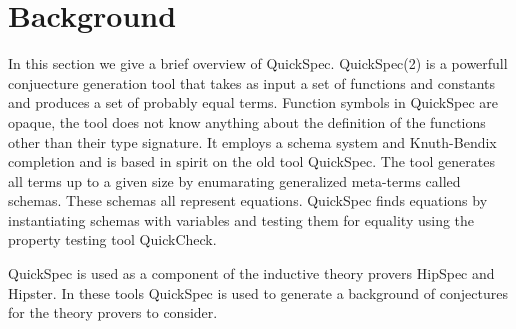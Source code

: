 \section{Background}
In this section we give a brief overview of
QuickSpec.
QuickSpec(2) is a powerfull conjuecture generation
tool that takes as input a set of functions and constants
and produces a set of probably equal terms.
Function symbols in QuickSpec are opaque, the tool
does not know anything about the definition of
the functions other than their type signature.
It employs a schema system and Knuth-Bendix
completion and is based in spirit on the old
tool QuickSpec\cite{Claessen2010}.
The tool generates all terms up to a given
size by enumarating generalized meta-terms called
schemas. These schemas all represent
equations. QuickSpec finds equations by instantiating
schemas with variables and testing them for equality
using the property testing tool QuickCheck\cite{Claessen2000}.

QuickSpec is used as a component of the inductive
theory provers HipSpec\cite{Claessen2013} and Hipster\cite{Johansson2014}.
In these tools QuickSpec is used to generate
a background of conjectures for the theory provers
to consider.
